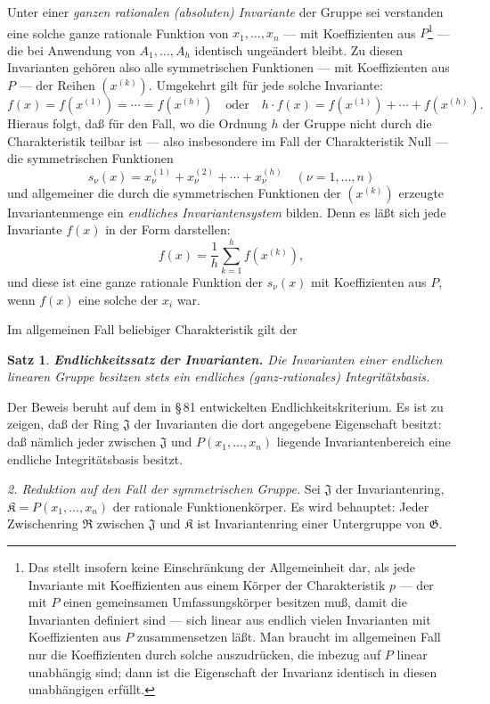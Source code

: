 \documentclass[12pt,a4paper]{article}
\newcommand{\fR}{\mathfrak{R}}
\newcommand{\fG}{\mathfrak{G}}
\newcommand{\fJ}{\mathfrak{J}}
\newcommand{\fK}{\mathfrak{K}}
\theoremstyle{plain}
\newtheorem{Satz}{Satz}[section]
\theoremstyle{definition}
\theoremstyle{remark}
\begin{document}
Unter einer \textit{ganzen rationalen (absoluten) Invariante} der Gruppe sei verstanden eine solche ganze rationale Funktion von $x_{1},\dots,x_{n}$ --- mit Koeffizienten aus $P$\footnote{Das stellt insofern keine Einschränkung der Allgemeinheit dar, als jede Invariante mit Koeffizienten aus einem Körper der Charakteristik $p$ --- der mit $P$ einen gemeinsamen Umfassungskörper besitzen muß, damit die Invarianten definiert sind --- sich linear aus endlich vielen Invarianten mit Koeffizienten aus $P$ zusammensetzen läßt. Man braucht im allgemeinen Fall nur die Koeffizienten durch solche auszudrücken, die inbezug auf $P$ linear unabhängig sind; dann ist die Eigenschaft der Invarianz identisch in diesen unabhängigen erfüllt.} --- die bei Anwendung von $A_{1},\dots,A_{h}$ identisch ungeändert bleibt. Zu diesen Invarianten gehören also alle symmetrischen Funktionen --- mit Koeffizienten aus $P$ --- der Reihen $(x^{(k)})$. Umgekehrt gilt für jede solche Invariante:
\[
f(x) = f(x^{(1)}) = \cdots = f(x^{(h)}) \quad \text{oder} \quad h \cdot f(x) = f(x^{(1)}) + \cdots + f(x^{(h)}).
\]
Hieraus folgt, daß für den Fall, wo die Ordnung $h$ der Gruppe nicht durch die Charakteristik teilbar ist --- also insbesondere im Fall der Charakteristik Null --- die symmetrischen Funktionen
\[
s_{\nu}(x) = x_{\nu}^{(1)} + x_{\nu}^{(2)} + \cdots + x_{\nu}^{(h)} \quad (\nu = 1,\dots,n)
\]
und allgemeiner die durch die symmetrischen Funktionen der $(x^{(k)})$ erzeugte Invariantenmenge ein \textit{endliches Invariantensystem} bilden. Denn es läßt sich jede Invariante $f(x)$ in der Form darstellen:
\[
f(x) = \frac{1}{h} \sum_{k=1}^{h} f(x^{(k)}),
\]
und diese ist eine ganze rationale Funktion der $s_{\nu}(x)$ mit Koeffizienten aus $P$, wenn $f(x)$ eine solche der $x_{i}$ war.

Im allgemeinen Fall beliebiger Charakteristik gilt der
\begin{Satz}
\textbf{Endlichkeitssatz der Invarianten.} Die Invarianten einer endlichen linearen Gruppe besitzen stets ein \textit{endliches \textup{(}ganz-rationales\textup{)} Integritätsbasis}.
\end{Satz}

Der Beweis beruht auf dem in \S\,81 entwickelten Endlichkeitskriterium. Es ist zu zeigen, daß der Ring $\fJ$ der Invarianten die dort angegebene Eigenschaft besitzt: daß nämlich jeder zwischen $\fJ$ und $P(x_{1},\dots,x_{n})$ liegende Invariantenbereich eine endliche Integritätsbasis besitzt.

\textit{2. Reduktion auf den Fall der symmetrischen Gruppe.} Sei $\fJ$ der Invariantenring, $\fK = P(x_{1},\dots,x_{n})$ der rationale Funktionenkörper. Es wird behauptet: Jeder Zwischenring $\fR$ zwischen $\fJ$ und $\fK$ ist Invariantenring einer Untergruppe von $\fG$.
\end{document}
